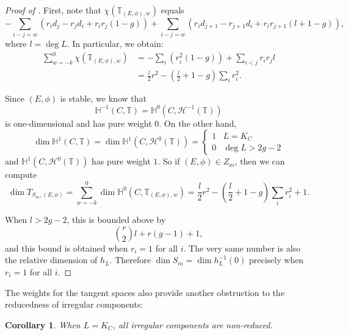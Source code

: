 \documentclass{amsart}
\theoremstyle{plain}
\newtheorem{corollary}[theorem]{Corollary}
\theoremstyle{definition}
\theoremstyle{remark}
\begin{document}
\begin{proof}[Proof of ]\label{pf:twistedstrata}
    First, note that $\chi(\mathbb{T}_{(E,\phi),w})$ equals
    \[-\sum_{i-j=w}(r_id_j - r_jd_i + r_ir_j(1-g)) + \sum_{i-j=w}(r_id_{j+1} - r_{j+1}d_i + r_ir_{j+1}(l + 1-g)),\]
    where $l=\deg L$.
    In particular, we obtain:
    \begin{align*}
        \sum_{w=-k}^0 \chi(\mathbb{T}_{(E,\phi),w}) &= -\sum_{i}(r_i^2(1-g)) + \sum_{i<j} r_ir_jl\\
        &= \frac{l}2r^2 - \left(\frac{l}2+1-g\right)\sum_ir_i^2.
    \end{align*}

    Since $(E,\phi)$ is stable, we know that
    \[\mathbb{H}^{-1}(C, \mathbb{T}) = \mathbb{H}^0(C, \mathcal H^{-1}(\mathbb{T})) \]
    is one-dimensional and has pure weight $0$.
    On the other hand,
    \[\dim\mathbb H^1(C, \mathbb{T}) = \dim\mathbb H^1(C, \mathcal H^0(\mathbb{T})) =\begin{cases} 1 & L = K_C\\ 0 & \deg L> 2g-2\end{cases}\]
    and $\mathbb H^1(C, \mathcal H^0(\mathbb{T}))$ has pure weight $1$.
    So if $(E,\phi)\in Z_m$, then we can compute
    \[\dim T_{S_m, (E,\phi)} = \sum_{w=-k}^0\dim \mathbb{H}^0(C, \mathbb{T}_{(E,\phi),w}) = \frac{l}2r^2 - \left(\frac{l}2+1-g\right)\sum_ir_i^2 + 1.\]

    When $l >2g-2$, this is bounded above by
    \[\binom{r}{2}l + r(g-1) + 1,\]
    and this bound is obtained when $r_i=1$ for all $i$.
    The very same number is also the relative dimension of $h_L$.
    Therefore $\dim S_m=\dim h_L^{-1}(0)$ precisely when $r_i=1$ for all $i$.
\end{proof}

The weights for the tangent spaces also provide another obstruction to the reducedness of irregular components:
\begin{corollary}\label{cor:hitchinirregnonred}
    When $L = K_C$, all irregular components are non-reduced.
\end{corollary}
\end{document}
